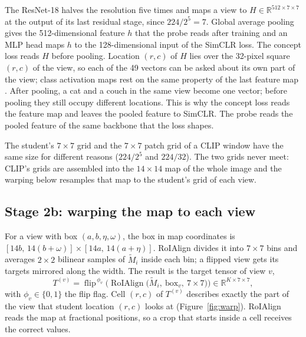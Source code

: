 \documentclass{article}
\begin{document}
The ResNet-18 \citep{he2016resnet} halves the resolution five times and maps a view to $H\in\mathbb{R}^{512\times7\times7}$ at the output of its last residual stage, since $224/2^5=7$. Global average pooling gives the 512-dimensional feature $h$ that the probe reads after training and an MLP head maps $h$ to the 128-dimensional input of the SimCLR loss. The concept loss reads $H$ before pooling. Location $(r,c)$ of $H$ lies over the 32-pixel square $(r,c)$ of the view, so each of the 49 vectors can be asked about its own part of the view; class activation maps rest on the same property of the last feature map \citep{zhou2016cam}. After pooling, a cat and a couch in the same view become one vector; before pooling they still occupy different locations. This is why the concept loss reads the feature map and leaves the pooled feature to SimCLR. The probe reads the pooled feature of the same backbone that the loss shapes.

The student's $7\times7$ grid and the $7\times7$ patch grid of a CLIP window have the same size for different reasons ($224/2^5$ and $224/32$). The two grids never meet: CLIP's grids are assembled into the $14\times14$ map of the whole image and the warping below resamples that map to the student's grid of each view.

\subsection{Stage 2b: warping the map to each view}
\label{sec:warp}
For a view with box $(a,b,\eta,\omega)$, the box in map coordinates is $[14b,\,14(b+\omega)]\times[14a,\,14(a+\eta)]$. RoIAlign \citep{he2017maskrcnn} divides it into $7\times7$ bins and averages $2\times2$ bilinear samples of $\tilde M_i$ inside each bin; a flipped view gets its targets mirrored along the width. The result is the target tensor of view $v$,
\begin{equation}
 T^{(v)}=\operatorname{flip}^{\,\phi_v}\!\Big(\operatorname{RoIAlign}\big(\tilde M_i,\ \text{box}_v,\ 7\times7\big)\Big)\in\mathbb{R}^{K\times7\times7},
\end{equation}
with $\phi_v\in\{0,1\}$ the flip flag. Cell $(r,c)$ of $T^{(v)}$ describes exactly the part of the view that student location $(r,c)$ looks at (Figure~\ref{fig:warp}). RoIAlign reads the map at fractional positions, so a crop that starts inside a cell receives the correct values.
\end{document}
